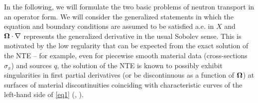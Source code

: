 In the following, we will formulate the two basic problems of neutron transport in an operator form.
We will consider the generalized statements in which the equation and boundary conditions are assumed to be satisfied a.e. in $X$ and
$\mathbf{\Omega}\cdot\nabla$ represents the generalized derivative in the usual Sobolev sense. This is motivated by the low
regularity that can be expected from the exact solution of the NTE -- for example, even for piecewise smooth material data
(cross-sections $\sigma_x$) and sources $q$, the solution of the NTE is known to possibly exhibit singularities in 
first partial derivatives (or be discontinuous as a function of $\mathbf{\Omega}$) at surfaces of material discontinuities 
coinciding with characteristic curves of the left-hand side of \eqref{eq1} (\cite[Chap. 1]{Agoshkov}, \cite[Sec.
III]{Vladimirov}).

